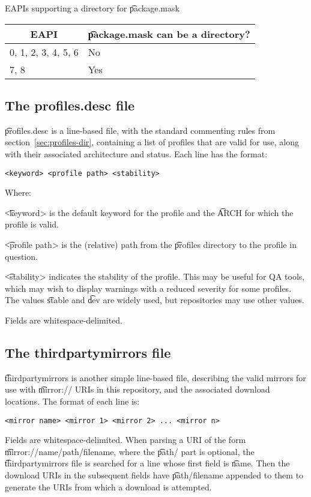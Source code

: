 \begin{centertable}{EAPIs supporting a directory for \t{package.mask}}
    \label{tab:package-mask-dir}
    \begin{tabular}{ll}
      \toprule
      \multicolumn{1}{c}{\textbf{EAPI}} &
      \multicolumn{1}{c}{\textbf{\t{package.mask} can be a directory?}} \\
      \midrule
      0, 1, 2, 3, 4, 5, 6 & No  \\
      7, 8                & Yes \\
      \bottomrule
    \end{tabular}
\end{centertable}

\subsection{The profiles.desc file}
\label{sec:profiles.desc}
\t{profiles.desc} is a line-based file, with the standard commenting
rules from section~\ref{sec:profiles-dir}, containing a list of profiles
that are valid for use, along with their associated architecture and
status. Each line has the format:

\begin{verbatim}
<keyword> <profile path> <stability>
\end{verbatim}

Where:
\nobreakpar
\begin{compactitem}
\item \t{<keyword>} is the default keyword for the profile and the \t{ARCH} for which the profile is
    valid.
\item \t{<profile path>} is the (relative) path from the \t{profiles} directory to the profile in
    question.
\item \t{<stability>} indicates the stability of the profile. This may be useful for QA tools, which
    may wish to display warnings with a reduced severity for some profiles. The values \t{stable}
    and \t{dev} are widely used, but repositories may use other values.
\end{compactitem}

Fields are whitespace-delimited.

\subsection{The thirdpartymirrors file}
\label{sec:thirdpartymirrors}
\t{thirdpartymirrors} is another simple line-based file, describing the valid mirrors for use with
\t{mirror://} URIs in this repository, and the associated download locations. The format of each
line is:
\begin{verbatim}
<mirror name> <mirror 1> <mirror 2> ... <mirror n>
\end{verbatim}
Fields are whitespace-delimited. When parsing a URI of the form
\t{mirror:/\slash name\slash path\slash filename},
where the \t{path/} part is optional, the \t{thirdpartymirrors} file is searched for a line whose
first field is \t{name}. Then the download URIs in the subsequent fields have
\t{path\slash filename} appended to them to generate the URIs from which a download is attempted.

